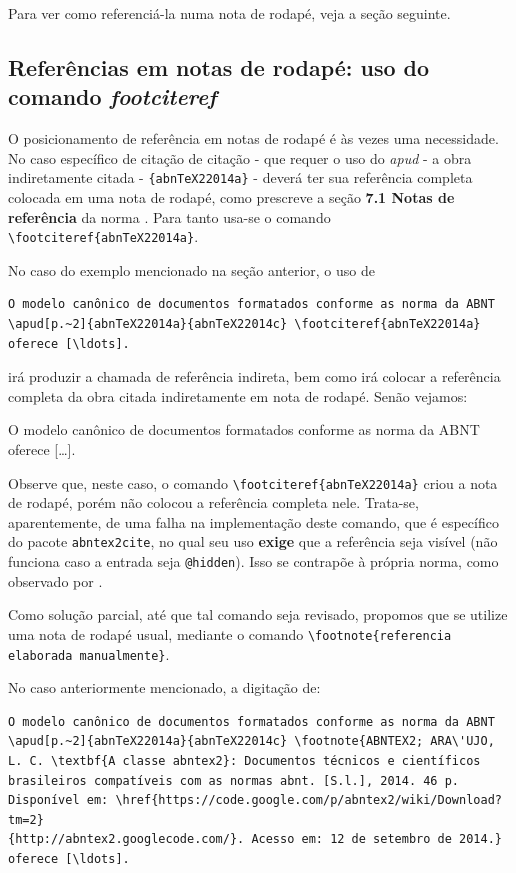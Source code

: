 \begin{apendicesenv}
Para ver como referenciá-la numa nota de rodapé, veja a seção seguinte.



\subsection{Referências em notas de rodapé: uso do comando \textit{footciteref}}
\label{subsec:refFootCite}

O posicionamento de referência em notas de rodapé é às vezes uma necessidade. No caso específico de citação de citação - que requer o uso do \textit{apud} - a obra indiretamente citada - \verb|{abnTeX22014a}| - deverá ter sua referência completa colocada em uma nota de rodapé, como prescreve a seção \textbf{7.1 Notas de referência} da norma . Para tanto usa-se o comando \verb|\footciteref{abnTeX22014a}|.

No caso do exemplo mencionado na seção anterior, o uso de

\begin{verbatim}
O modelo canônico de documentos formatados conforme as norma da ABNT
\apud[p.~2]{abnTeX22014a}{abnTeX22014c} \footciteref{abnTeX22014a}
oferece [\ldots].
\end{verbatim}

irá produzir a chamada de referência indireta, bem como irá colocar a referência completa da obra citada indiretamente em nota de rodapé. Senão vejamos:

O modelo canônico de documentos formatados conforme as norma da ABNT   oferece [\ldots].

Observe que, neste caso, o comando \verb|\footciteref{abnTeX22014a}| criou a nota de rodapé, porém não colocou a referência completa nele. Trata-se, aparentemente, de uma falha na implementação deste comando, que é específico do pacote \texttt{abntex2cite}, no qual seu uso \textbf{exige} que a referência seja visível (não funciona caso a entrada seja \texttt{@hidden}). Isso se contrapõe à própria norma, como observado por  .

Como solução parcial, até que tal comando seja revisado, propomos que se utilize uma  nota de rodapé usual, mediante o comando  \verb|\footnote{referencia elaborada manualmente}|.

No caso anteriormente mencionado, a digitação de:

\begin{verbatim}
O modelo canônico de documentos formatados conforme as norma da ABNT
\apud[p.~2]{abnTeX22014a}{abnTeX22014c} \footnote{ABNTEX2; ARA\'UJO,
L. C. \textbf{A classe abntex2}: Documentos técnicos e científicos
brasileiros compatíveis com as normas abnt. [S.l.], 2014. 46 p.
Disponível em: \href{https://code.google.com/p/abntex2/wiki/Download?tm=2}
{http://abntex2.googlecode.com/}. Acesso em: 12 de setembro de 2014.}
oferece [\ldots].
\end{verbatim}


\end{apendicesenv}
